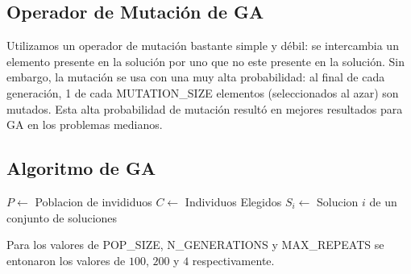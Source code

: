 \documentclass{ci5652}
\begin{document}
\subsection{Operador de Mutación de GA}
Utilizamos un operador de mutación bastante simple y débil: se intercambia un elemento presente en la solución por uno que no este presente en la solución. Sin embargo, la mutación se usa con una muy alta probabilidad: al final de cada generación, 1 de cada MUTATION\_SIZE elementos (seleccionados al azar) son mutados. Esta alta probabilidad de mutación resultó en mejores resultados para GA en los problemas medianos.

\subsection{Algoritmo de GA}
\begin{algorithm}
\DontPrintSemicolon
$P \leftarrow$ Poblacion de invididuos\;
$C \leftarrow$ Individuos Elegidos\;
$S_i \leftarrow$ Solucion $i$ de un conjunto de soluciones\;
\end{algorithm}

Para los valores de POP\_SIZE, N\_GENERATIONS y MAX\_REPEATS se entonaron los valores de $100$, $200$ y $4$ respectivamente.


\small

\end{document}
